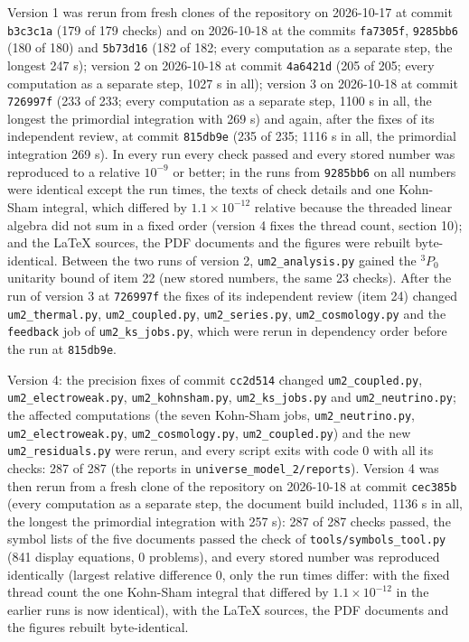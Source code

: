 \documentclass[
  10pt,
]{article}
\begin{document}
Version 1 was rerun from fresh clones of the repository on 2026-10-17 at
commit \texttt{b3c3c1a} (179 of 179 checks) and on 2026-10-18 at the
commits \texttt{fa7305f}, \texttt{9285bb6} (180 of 180) and
\texttt{5b73d16} (182 of 182; every computation as a separate step, the
longest 247 s); version 2 on 2026-10-18 at commit \texttt{4a6421d} (205
of 205; every computation as a separate step, 1027 s in all); version 3
on 2026-10-18 at commit \texttt{726997f} (233 of 233; every computation
as a separate step, 1100 s in all, the longest the primordial
integration with 269 s) and again, after the fixes of its independent
review, at commit \texttt{815db9e} (235 of 235; 1116 s in all, the
primordial integration 269 s). In every run every check passed and every
stored number was reproduced to a relative \(10^{-9}\) or better; in the
runs from \texttt{9285bb6} on all numbers were identical except the run
times, the texts of check details and one Kohn-Sham integral, which
differed by \(1.1\times10^{-12}\) relative because the threaded linear
algebra did not sum in a fixed order (version 4 fixes the thread count,
section 10); and the LaTeX sources, the PDF documents and the figures
were rebuilt byte-identical. Between the two runs of version 2,
\texttt{um2\_analysis.py} gained the \(^3P_0\) unitarity bound of item
22 (new stored numbers, the same 23 checks). After the run of version 3
at \texttt{726997f} the fixes of its independent review (item 24)
changed \texttt{um2\_thermal.py}, \texttt{um2\_coupled.py},
\texttt{um2\_series.py}, \texttt{um2\_cosmology.py} and the
\texttt{feedback} job of \texttt{um2\_ks\_jobs.py}, which were rerun in
dependency order before the run at \texttt{815db9e}.

Version 4: the precision fixes of commit \texttt{cc2d514} changed
\texttt{um2\_coupled.py}, \texttt{um2\_electroweak.py},
\texttt{um2\_kohnsham.py}, \texttt{um2\_ks\_jobs.py} and
\texttt{um2\_neutrino.py}; the affected computations (the seven
Kohn-Sham jobs, \texttt{um2\_neutrino.py}, \texttt{um2\_electroweak.py},
\texttt{um2\_cosmology.py}, \texttt{um2\_coupled.py}) and the new
\texttt{um2\_residuals.py} were rerun, and every script exits with code
0 with all its checks: 287 of 287 (the reports in
\texttt{universe\_model\_2/reports}). Version 4 was then rerun from a
fresh clone of the repository on 2026-10-18 at commit \texttt{cec385b}
(every computation as a separate step, the document build included, 1136
s in all, the longest the primordial integration with 257 s): 287 of 287
checks passed, the symbol lists of the five documents passed the check
of \texttt{tools/symbols\_tool.py} (841 display equations, 0 problems),
and every stored number was reproduced identically (largest relative
difference 0, only the run times differ: with the fixed thread count the
one Kohn-Sham integral that differed by \(1.1\times10^{-12}\) in the
earlier runs is now identical), with the LaTeX sources, the PDF
documents and the figures rebuilt byte-identical.
\end{document}
